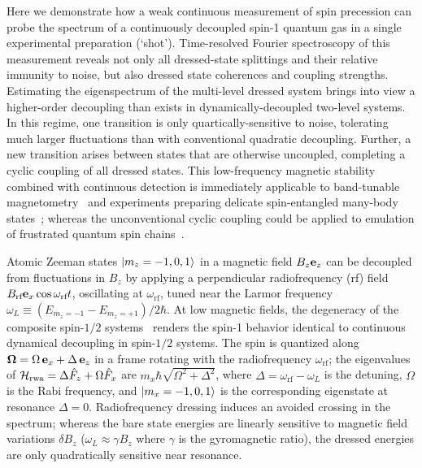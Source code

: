\documentclass[aps,prl,reprint,superscriptaddress,floatfix]{revtex4-1}
\begin{document}
Here we demonstrate how a weak continuous measurement of spin precession can probe the spectrum of a continuously decoupled spin-1 quantum gas in a single experimental preparation (`shot').
Time-resolved Fourier spectroscopy of this measurement reveals not only all dressed-state splittings and their relative immunity to noise, but also dressed state coherences and coupling strengths.
Estimating the eigenspectrum of the multi-level dressed system brings into view a higher-order decoupling than exists in dynamically-decoupled two-level systems.
In this regime, one transition is only quartically-sensitive to noise, tolerating much larger fluctuations than with conventional quadratic decoupling.
Further, a new transition arises between states that are otherwise uncoupled, completing a cyclic coupling of all dressed states. 
This low-frequency magnetic stability combined with continuous detection is immediately applicable to band-tunable magnetometry~\cite{hirose_continuous_2012,loretz_radio-frequency_2013,ockeloen_quantum_2013,*horsley_frequency-tunable_2016} and experiments preparing delicate spin-entangled many-body states~\cite{stamper-kurn_spinor_2013}; whereas the unconventional cyclic coupling could be applied to emulation of frustrated quantum spin chains~\cite{mikeska_one-dimensional_2004}.

Atomic Zeeman states $\vert m_z=-1,0,1 \rangle $ in a magnetic field $B_z \mathbf{e}_z$ can be decoupled from fluctuations in $B_z$ by applying a perpendicular radiofrequency (rf) field $B_{\text{rf}} \mathbf{e}_x \cos \omega_\text{rf} t$, oscillating at $\omega_\text{rf}$, tuned near the Larmor frequency $\omega_L \equiv (E_{m_z=-1}-E_{m_z=+1})/2\hbar$.
At low magnetic fields, the degeneracy of the composite spin-$1/2$ systems~\cite{majorana_atomi_1932} renders the spin-1 behavior identical to continuous dynamical decoupling in spin-$1/2$ systems.
The spin is quantized along $\mathbf{\Omega} = \Omega \, \mathbf{e}_x + \Delta \, \mathbf{e}_z$ in a frame rotating with the radiofrequency $\omega_{\text{rf}}$; the eigenvalues of $\mathcal{H}_{\text{rwa}} = \Delta \hat{F}_z + \Omega \hat{F}_x$ are $m_x \hbar \sqrt{\Omega^2 + \Delta^2}$, where $\Delta = \omega_{\text{rf}}-\omega_L$ is the detuning, $\Omega$ is the Rabi frequency, and $\vert m_x=-1,0,1 \rangle $ is the corresponding eigenstate at resonance $\Delta=0$.
Radiofrequency dressing induces an avoided crossing in the spectrum; whereas the bare state energies are linearly sensitive to magnetic field variations $\delta B_z$ ($\omega_L \approx \gamma B_z$ where $\gamma$ is the gyromagnetic ratio), the dressed energies are only quadratically sensitive near resonance.
\end{document}
